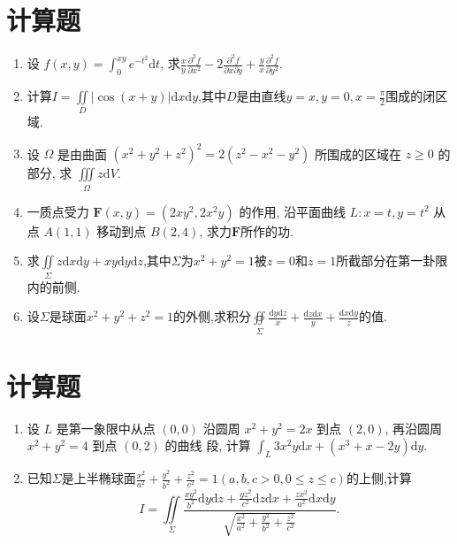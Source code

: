 \documentclass[twocolumn,UTF8]{ctexart}
\begin{document}
\newpage\section{计算题}
\begin{enumerate}
\item 设 $f(x, y)=\int_{0}^{x y} e^{-t^{2}} \mathrm{d} t$, 求$ \frac{x}{y} \frac{\partial^{2} f}{\partial x^{2}}-2 \frac{\partial^{2} f}{\partial x \partial y}+\frac{y}{x} \frac{\partial^{2} f}{\partial y^{2}}$.

\vspace{8cm}
\item 计算$I=\iint\limits_D |\cos (x+y)|\mathrm{d}x\mathrm{d}y$,其中$D$是由直线$y=x,y=0,x=\frac{\pi}{2}$围成的闭区域.

\newpage\item 设 $\Omega$ 是由曲面 $\left(x^{2}+y^{2}+z^{2}\right)^{2}=2\left(z^{2}-x^{2}-y^{2}\right)$ 所围成的区域在 $z \geqslant 0$ 的部分, 求 $\iiint\limits_{\Omega} z \mathrm{d} V$.

\vspace{8cm}
\item 一质点受力 $\boldsymbol{F}(x, y)=\left(2 x y^{2}, 2 x^{2} y\right)$ 的作用, 沿平面曲线 $L: x=t, y=t^{2}$ 从点 $A(1,1)$ 移动到点 $B(2,4)$, 求力$\boldsymbol{F}$所作的功.

\newpage\item 求$\iint\limits_{\Sigma} z \mathrm{d} x \mathrm{d} y+x y \mathrm{d} y \mathrm{d} z$,其中$\Sigma$为$x^2+y^2=1$被$z=0$和$z=1$所截部分在第一卦限内的前侧.

\vspace{8cm}
\item 设$\Sigma$是球面$x^2+y^2+z^2=1$的外侧,求积分$\oiint\limits_{\Sigma} \frac{\mathrm{d} y \mathrm{d} z}{x}+\frac{\mathrm{d} z \mathrm{d} x}{y}+\frac{\mathrm{d} x \mathrm{d} y}{z}$的值.
\end{enumerate}

\newpage\section{计算题}
\begin{enumerate}
\item 设 $L$ 是第一象限中从点 $(0,0)$ 沿圆周 $x^{2}+y^{2}=2 x$ 到点 $(2,0)$, 再沿圆周 $x^{2}+y^{2}=4$ 到点 $(0,2)$ 的曲线 段, 计算 $\int_{L} 3 x^{2} y \mathrm{d} x+\left(x^{3}+x-2 y\right) \mathrm{d} y$.

\newpage\item 已知$\Sigma$是上半椭球面$\frac{x^{2}}{a^{2}}+\frac{y^{2}}{b^{2}}+\frac{z^{2}}{c^{2}}=1(a,b,c>0,0\leqslant z \leqslant c)$的上侧,计算
$$
I=\iint\limits_{\Sigma} \frac{\displaystyle\frac{x y^{2}}{b^{2}} \mathrm{d} y \mathrm{d} z+\frac{y z^{2}}{c^{2}} \mathrm{d} z \mathrm{d} x+\frac{z x^{2}}{a^{2}} \mathrm{d} x \mathrm{d} y}{\displaystyle\sqrt{\frac{x^{2}}{a^{2}}+\frac{y^{2}}{b^{2}}+\frac{z^{2}}{c^{2}}}}.
$$
\end{enumerate}
\end{document}
